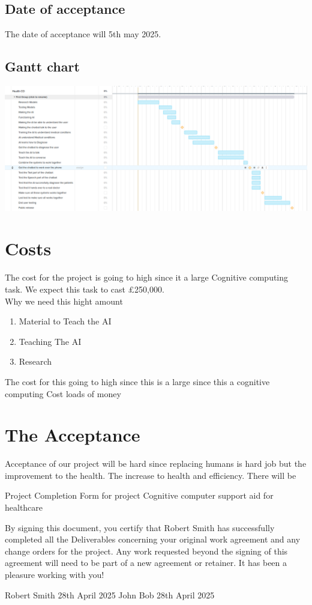 \documentclass{article}
\begin{document}
\subsection{Date of acceptance}
The date of acceptance will 5th may 2025.  

\subsection{Gantt chart}
\includegraphics[scale=0.25]{gantt}






\section{Costs}
The cost for the project is going to high since it a large Cognitive computing task. We expect this task to cast £250,000. \\
Why we need this hight amount
\begin{enumerate}
	\item Material to Teach the AI
	\item Teaching The AI
	\item Research 
\end{enumerate}
The cost for this going to high since this is a large since this a cognitive computing 
Cost loads of money

\section{The Acceptance}
Acceptance of our project will be hard since replacing humans is hard job but the improvement to the health. The increase to health and efficiency. There will be 

{\huge Project Completion Form for project} Cognitive computer support aid for healthcare

By signing this document, you certify that Robert Smith has successfully completed all the Deliverables concerning your original work agreement and any change orders for the project. Any work requested beyond the signing of this agreement will need to be part of a new agreement or retainer. 
It has been a pleasure working with you!

Robert Smith
28th April 2025
John Bob
28th April 2025
\end{document}
